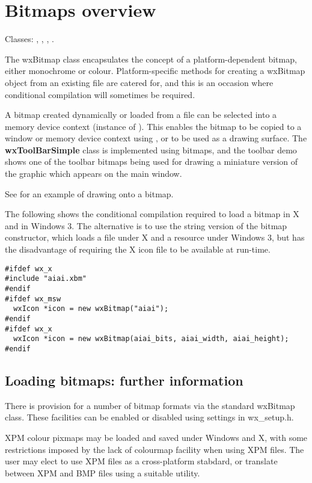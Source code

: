 \section{Bitmaps overview}\label{wxbitmapoverview}

Classes: , , , .

The wxBitmap class encapsulates the concept of a platform-dependent bitmap,
either monochrome or colour. Platform-specific methods for creating a
wxBitmap object from an existing file are catered for, and
this is an occasion where conditional compilation will sometimes be
required.

A bitmap created dynamically or loaded from a file can be selected
into a memory device context (instance of ). This
enables the bitmap to be copied to a window or memory device context
using , or to be used as a drawing surface.  The {\bf
wxToolBarSimple} class is implemented using bitmaps, and the toolbar demo
shows one of the toolbar bitmaps being used for drawing a miniature
version of the graphic which appears on the main window.

See  for an example of drawing onto a bitmap.

The following shows the conditional compilation required to load a
bitmap in X and in Windows 3. The alternative is to use the string
version of the bitmap constructor, which loads a file under X and a
resource under Windows 3, but has the disadvantage of requiring the
X icon file to be available at run-time.

\begin{verbatim}
#ifdef wx_x
#include "aiai.xbm"
#endif
#ifdef wx_msw
  wxIcon *icon = new wxBitmap("aiai");
#endif
#ifdef wx_x
  wxIcon *icon = new wxBitmap(aiai_bits, aiai_width, aiai_height);
#endif
\end{verbatim}

\subsection{Loading bitmaps: further information}

There is provision for a number of bitmap
formats via the standard wxBitmap class. These facilities can
be enabled or disabled using settings in wx\_setup.h.

XPM colour pixmaps may be loaded and saved under Windows and X, with
some restrictions imposed by the lack of colourmap facility when
using XPM files. The user may elect to use XPM files as a cross-platform
stabdard, or translate between XPM and BMP files using a suitable
utility.

